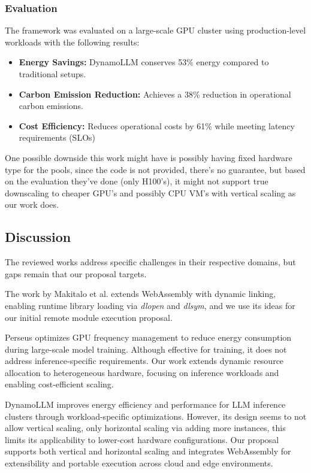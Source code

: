 \subsubsection*{Evaluation}

The framework was evaluated on a large-scale GPU cluster using production-level workloads with the following results:

\begin{itemize}
    \item \textbf{Energy Savings:} DynamoLLM conserves 53\% energy compared to traditional setups.
    \item \textbf{Carbon Emission Reduction:} Achieves a 38\% reduction in operational carbon emissions.
    \item \textbf{Cost Efficiency:} Reduces operational costs by 61\% while meeting latency requirements (SLOs)
\end{itemize}

One possible downside this work might have is possibly having fixed hardware type for the pools, since the code is not provided, there's no guarantee, but based on the evaluation they've done (only H100's), it might not support true downscaling to cheaper GPU's and possibly CPU VM's with vertical scaling as our work does.

\subsection{Discussion}

The reviewed works address specific challenges in their respective domains, but gaps remain that our proposal targets.

The work by Makitalo et al. extends WebAssembly with dynamic linking, enabling runtime library loading via \textit{dlopen} and \textit{dlsym}, and we use its ideas for our initial remote module execution proposal.

Perseus optimizes GPU frequency management to reduce energy consumption during large-scale model training. Although effective for training, it does not address inference-specific requirements. Our work extends dynamic resource allocation to heterogeneous hardware, focusing on inference workloads and enabling cost-efficient scaling.

DynamoLLM improves energy efficiency and performance for LLM inference clusters through workload-specific optimizations. However, its design seems to not allow vertical scaling, only horizontal scaling via adding more instances, this limits its applicability to lower-cost hardware configurations. Our proposal supports both vertical and horizontal scaling and integrates WebAssembly for extensibility and portable execution across cloud and edge environments.
